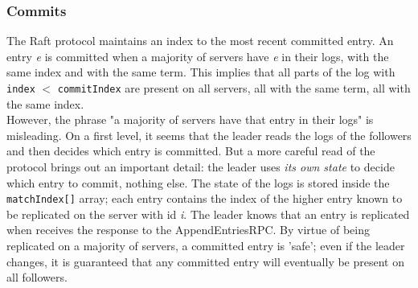 \subsubsection{Commits}
\label{committing-entries}
The Raft protocol maintains an index to the most recent committed entry. An entry \emph{e} is committed when a majority of servers have \emph{e} in their logs, with the same index and with the same term. This implies that all parts of the log with \texttt{index} $<$ \texttt{commitIndex} are present on all servers, all with the same term, all with the same index. \\
However, the phrase "a majority of servers have that entry in their logs" is misleading. On a first level, it seems that the leader reads the logs of the followers and then decides which entry is committed. But a more careful read of the protocol brings out an important detail: the leader uses \emph{its own state} to decide which entry to commit, nothing else. The state of the logs is stored inside the \texttt{matchIndex[]} array; each entry contains the index of the higher entry known to be replicated on the server with id \emph{i}. The leader knows that an entry is replicated when receives the response to the AppendEntriesRPC. By virtue of being replicated on a majority of servers, a committed entry is 'safe'; even if the leader changes, it is guaranteed that any committed entry will eventually be present on all followers.

\clearpage
\newpage

